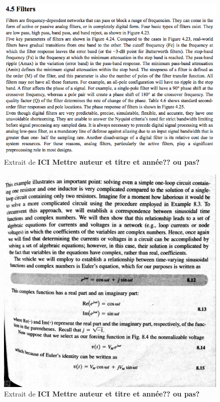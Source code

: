 \begin{figure}[h]
\begin{center}
\includegraphics[scale=0.7]{img/Kularatna-1}
\end{center}
\caption{Extrait de \cite[p.~249-251]{Kularatna}\textbf{ICI Mettre auteur et titre et année?? ou pas?}} %
\label{Trace 5}
\end{figure}

\begin{figure}[h]
\begin{center}
\includegraphics[scale=0.5]{img/Irwin-1}
\end{center}
\caption{Extrait de \cite[p.~375]{Irwin}\textbf{ICI Mettre auteur et titre et année?? ou pas?}}%
\label{Trace 6}
\end{figure}

